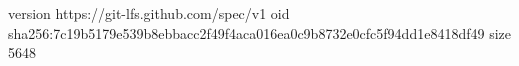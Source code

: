 version https://git-lfs.github.com/spec/v1
oid sha256:7c19b5179e539b8ebbacc2f49f4aca016ea0c9b8732e0cfc5f94dd1e8418df49
size 5648
